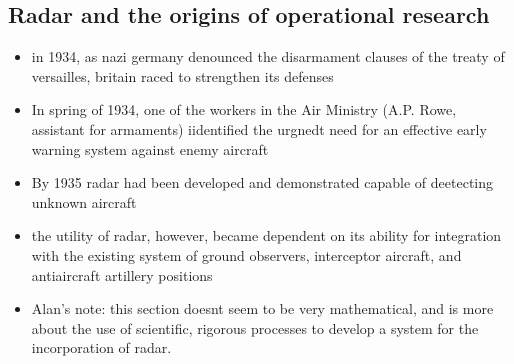 \documentclass{article}
\begin{document}
\subsection{Radar and the origins of operational research}
\begin{itemize}
\item in 1934, as nazi germany denounced the disarmament clauses of the treaty of versailles, britain raced to strengthen its defenses 
\item In spring of 1934, one of the workers in the Air Ministry (A.P. Rowe, assistant for armaments) iidentified the urgnedt need for an effective early warning system against enemy aircraft
\item By 1935 radar had been developed and demonstrated capable of deetecting unknown aircraft
\item the utility of radar, however, became dependent on its ability for integration with the existing system of ground observers, interceptor aircraft, and antiaircraft artillery positions
\item Alan's note: this section doesnt seem to be very mathematical, and is more about the use of scientific, rigorous processes to develop a system for the incorporation of radar. 
\end{itemize}
\end{document}
